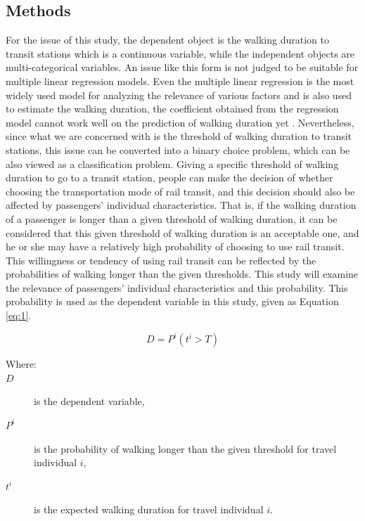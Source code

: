 \documentclass[Journal,letterpaper]{ascelike-new}
\begin{document}
\subsection{Methods}
For the issue of this study, the dependent object is the walking duration to transit stations which is a continuous variable, while the independent objects are multi-categorical variables. An issue like this form is not judged to be suitable for multiple linear regression models. Even the multiple linear regression is the most widely used model for analyzing the relevance of various factors and is also used to estimate the walking duration, the coefficient obtained from the regression model cannot work well on the prediction of walking duration yet \cite{Krygsman2004}. Nevertheless, since what we are concerned with is the threshold of walking duration to transit stations, this issue can be converted into a binary choice problem, which can be also viewed as a classification problem. Giving a specific threshold of walking duration to go to a transit station, people can make the decision of whether choosing the transportation mode of rail transit, and this decision should also be affected by passengers' individual characteristics. That is, if the walking duration of a passenger is longer than a given threshold of walking duration, it can be considered that this given threshold of walking duration is an acceptable one, and he or she may have a relatively high probability of choosing to use rail transit. This willingness or tendency of using rail transit can be reflected by the probabilities of walking longer than the given thresholds. This study will examine the relevance of passengers' individual characteristics and this probability. This probability is used as the dependent variable in this study, given as Equation \ref{eq:1}.

%
\begin{equation}
    D=P^i(t^i>T)
    \label{eq:1}
\end{equation}

%
\begin{description}
    \item[Where:]
    \item[$D$] is the dependent variable,
    \item[$P^i$] is the probability of walking longer than the given threshold for travel individual $i$,
    \item[$t^i$] is the expected walking duration for travel individual $i$.
\end{description}
\end{document}

